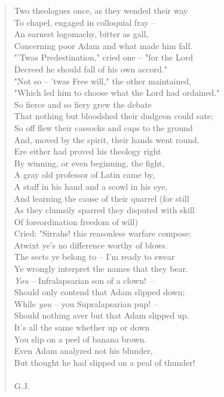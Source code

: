 \documentclass[11pt]{article}
\begin{document}
\begin{quote}   Two theologues once, as they wended their way \\
  To chapel, engaged in colloquial fray -- \\
  An earnest logomachy, bitter as gall, \\
  Concerning poor Adam and what made him fall. \\
  "'Twas Predestination," cried one -- "for the Lord \\
  Decreed he should fall of his own accord." \\
  "Not so -- 'twas Free will," the other maintained, \\
  "Which led him to choose what the Lord had ordained." \\
  So fierce and so fiery grew the debate \\
  That nothing but bloodshed their dudgeon could sate; \\
  So off flew their cassocks and caps to the ground \\
  And, moved by the spirit, their hands went round. \\
  Ere either had proved his theology right \\
  By winning, or even beginning, the fight, \\
  A gray old professor of Latin came by, \\
  A staff in his hand and a scowl in his eye, \\
  And learning the cause of their quarrel (for still \\
  As they clumsily sparred they disputed with skill \\
  Of foreordination freedom of will) \\
  Cried:  "Sirrahs! this reasonless warfare compose: \\
  Atwixt ye's no difference worthy of blows. \\
  The sects ye belong to -- I'm ready to swear \\
  Ye wrongly interpret the names that they bear. \\
  {\em You} -- Infralapsarian son of a clown! -- \\
  Should only contend that Adam slipped down; \\
  While {\em you} -- you Supralapsarian pup! -- \\
  Should nothing aver but that Adam slipped up. \\
  It's all the same whether up or down \\
  You slip on a peel of banana brown. \\
  Even Adam analyzed not his blunder, \\
  But thought he had slipped on a peal of thunder! \\
 \\
G.J. \end{quote}
\end{document}
